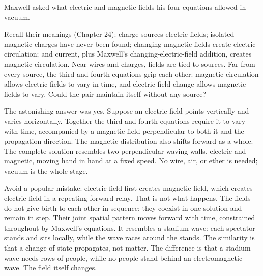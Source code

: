 \begin{mainline}
Maxwell asked what electric and magnetic fields his four equations allowed in vacuum.

Recall their meanings (Chapter 24): charge sources electric fields; isolated magnetic charges have never been found; changing magnetic fields create electric circulation; and current, plus Maxwell's changing-electric-field addition, creates magnetic circulation. Near wires and charges, fields are tied to sources. Far from every source, the third and fourth equations grip each other: magnetic circulation allows electric fields to vary in time, and electric-field change allows magnetic fields to vary. Could the pair maintain itself without any source?

The astonishing answer was yes. Suppose an electric field points vertically and varies horizontally. Together the third and fourth equations require it to vary with time, accompanied by a magnetic field perpendicular to both it and the propagation direction. The magnetic distribution also shifts forward as a whole. The complete solution resembles two perpendicular waving walls, electric and magnetic, moving hand in hand at a fixed speed. No wire, air, or ether is needed; vacuum is the whole stage.

Avoid a popular mistake: electric field first creates magnetic field, which creates electric field in a repeating forward relay. That is not what happens. The fields do not give birth to each other in sequence; they coexist in one solution and remain in step. Their joint spatial pattern moves forward with time, constrained throughout by Maxwell's equations. It resembles a stadium wave: each spectator stands and sits locally, while the wave races around the stands. The similarity is that a change of state propagates, not matter. The difference is that a stadium wave needs rows of people, while no people stand behind an electromagnetic wave. The field itself changes.

\begin{center}
\end{center}


\end{mainline}
